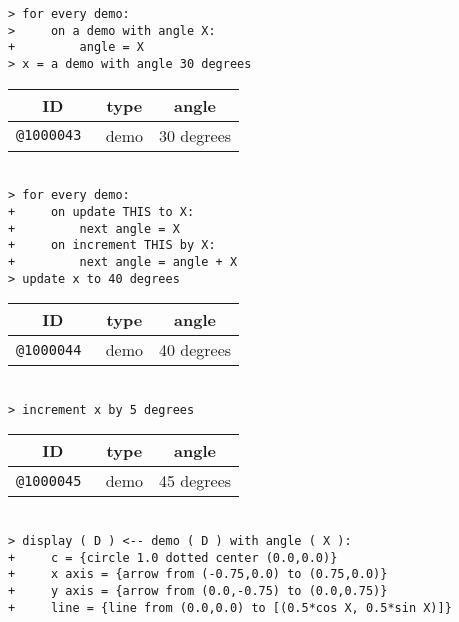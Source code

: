 \documentclass[12pt]{article}
\newenvironment{indpar}[1][0.3in]%
	{\begin{list}{}%
		     {\setlength{\itemsep}{0in}%
		      \setlength{\topsep}{0in}%
		      \setlength{\parsep}{1ex}%
		      \setlength{\labelwidth}{#1}%
		      \setlength{\leftmargin}{#1}%
		      \addtolength{\leftmargin}{\labelsep}}%
	 \item}%
	{\end{list}}
\begin{document}
\begin{indpar}
\verb|> for every demo:| \\
\verb|>     on a demo with angle X:| \\
\verb|+         angle = X| \\
\verb|> x = a demo with angle 30 degrees| \\
\begin{tabular}{|r|r|r|}
\hline
\multicolumn{1}{|c}{\bf ID} &
\multicolumn{1}{|c}{\bf type} &
\multicolumn{1}{|c|}{\bf angle} \\
\hline
\tt @1000043 & demo & 30 degrees \\
\hline
\end{tabular} \\[0.5ex]
\verb|> for every demo:| \\
\verb|+     on update THIS to X:|\\
\verb|+         next angle = X| \\
\verb|+     on increment THIS by X:| \\
\verb|+         next angle = angle + X| \\
\verb|> update x to 40 degrees| \\
\begin{tabular}{|r|r|r|}
\hline
\multicolumn{1}{|c}{\bf ID} &
\multicolumn{1}{|c}{\bf type} &
\multicolumn{1}{|c|}{\bf angle} \\
\hline
\tt @1000044 & demo & 40 degrees \\
\hline
\end{tabular} \\[0.5ex]
\verb|> increment x by 5 degrees| \\
\begin{tabular}{|r|r|r|}
\hline
\multicolumn{1}{|c}{\bf ID} &
\multicolumn{1}{|c}{\bf type} &
\multicolumn{1}{|c|}{\bf angle} \\
\hline
\tt @1000045 & demo & 45 degrees \\
\hline
\end{tabular} \\[0.5ex]
\verb|> display ( D ) <-- demo ( D ) with angle ( X ):| \\
\verb|+     c = {circle 1.0 dotted center (0.0,0.0)}| \\
\verb|+     x axis = {arrow from (-0.75,0.0) to (0.75,0.0)}| \\
\verb|+     y axis = {arrow from (0.0,-0.75) to (0.0,0.75)}| \\
\verb|+     line = {line from (0.0,0.0) to [(0.5*cos X, 0.5*sin X)]}| \\

\end{indpar}
\end{document}
